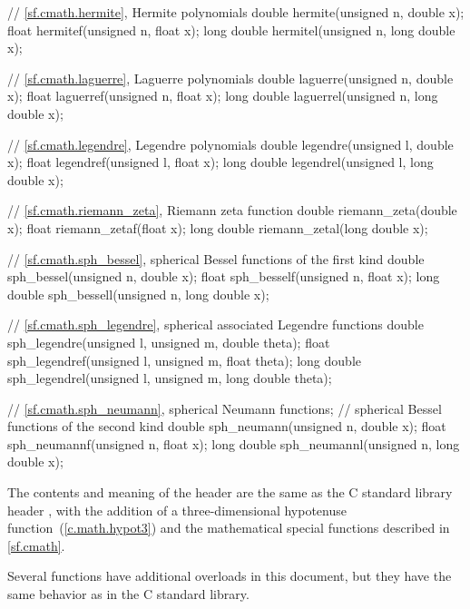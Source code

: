\begin{codeblock}
{  // \ref{sf.cmath.hermite}, Hermite polynomials
  double       hermite(unsigned n, double x);
  float        hermitef(unsigned n, float x);
  long double  hermitel(unsigned n, long double x);

  // \ref{sf.cmath.laguerre}, Laguerre polynomials
  double       laguerre(unsigned n, double x);
  float        laguerref(unsigned n, float x);
  long double  laguerrel(unsigned n, long double x);

  // \ref{sf.cmath.legendre}, Legendre polynomials
  double       legendre(unsigned l, double x);
  float        legendref(unsigned l, float x);
  long double  legendrel(unsigned l, long double x);

  // \ref{sf.cmath.riemann_zeta}, Riemann zeta function
  double       riemann_zeta(double x);
  float        riemann_zetaf(float x);
  long double  riemann_zetal(long double x);

  // \ref{sf.cmath.sph_bessel}, spherical Bessel functions of the first kind
  double       sph_bessel(unsigned n, double x);
  float        sph_besself(unsigned n, float x);
  long double  sph_bessell(unsigned n, long double x);

  // \ref{sf.cmath.sph_legendre}, spherical associated Legendre functions
  double       sph_legendre(unsigned l, unsigned m, double theta);
  float        sph_legendref(unsigned l, unsigned m, float theta);
  long double  sph_legendrel(unsigned l, unsigned m, long double theta);

  // \ref{sf.cmath.sph_neumann}, spherical Neumann functions;
  // spherical Bessel functions of the second kind
  double       sph_neumann(unsigned n, double x);
  float        sph_neumannf(unsigned n, float x);
  long double  sph_neumannl(unsigned n, long double x);
}
\end{codeblock}

\pnum
The contents and meaning of the header 
are the same as the C standard library header ,
with the addition of
a three-dimensional hypotenuse function~(\ref{c.math.hypot3}) and
the mathematical special functions described in \ref{sf.cmath}.
\begin{note}
Several functions have additional overloads in this document,
but they have the same behavior as in the C standard library.
\end{note}

